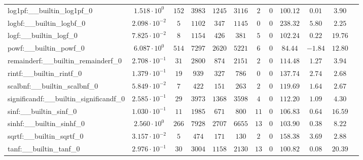 \begin{tabular}{|l|c|c|c|c|c|c|c|c|c|c|c|}
log1pf:\_\_builtin\_log1pf\_0             & $ 1.518 \cdot 10^{0}  $ & $ 152    $ & $ 3983   $ & $ 1245  $ & $ 3116  $ & $ 2   $ & $ 0 $ & $ 100.12      $ & $ 0.01    $ & $ 3.90    $ \\
logbf:\_\_builtin\_logbf\_0               & $ 2.098 \cdot 10^{-2} $ & $ 5      $ & $ 1102   $ & $ 347   $ & $ 1145  $ & $ 0   $ & $ 0 $ & $ 238.32      $ & $ 5.80    $ & $ 2.25    $ \\
logf:\_\_builtin\_logf\_0                 & $ 7.825 \cdot 10^{-2} $ & $ 8      $ & $ 1154   $ & $ 426   $ & $ 381   $ & $ 5   $ & $ 0 $ & $ 102.24      $ & $ 0.22    $ & $ 19.76   $ \\
powf:\_\_builtin\_powf\_0                 & $ 6.087 \cdot 10^{0}  $ & $ 514    $ & $ 7297   $ & $ 2620  $ & $ 5221  $ & $ 6   $ & $ 0 $ & $ 84.44       $ & $ -1.84   $ & $ 12.80   $ \\
remainderf:\_\_builtin\_remainderf\_0     & $ 2.708 \cdot 10^{-1} $ & $ 31     $ & $ 2800   $ & $ 874   $ & $ 2151  $ & $ 2   $ & $ 0 $ & $ 114.48      $ & $ 1.27    $ & $ 3.94    $ \\
rintf:\_\_builtin\_rintf\_0               & $ 1.379 \cdot 10^{-1} $ & $ 19     $ & $ 939    $ & $ 327   $ & $ 786   $ & $ 0   $ & $ 0 $ & $ 137.74      $ & $ 2.74    $ & $ 2.68    $ \\
scalbnf:\_\_builtin\_scalbnf\_0           & $ 5.849 \cdot 10^{-2} $ & $ 7      $ & $ 422    $ & $ 151   $ & $ 263   $ & $ 2   $ & $ 0 $ & $ 119.69      $ & $ 1.64    $ & $ 2.67    $ \\
significandf:\_\_builtin\_significandf\_0 & $ 2.585 \cdot 10^{-1} $ & $ 29     $ & $ 3973   $ & $ 1368  $ & $ 3598  $ & $ 4   $ & $ 0 $ & $ 112.20      $ & $ 1.09    $ & $ 4.30    $ \\
sinf:\_\_builtin\_sinf\_0                 & $ 1.030 \cdot 10^{-1} $ & $ 11     $ & $ 1985   $ & $ 671   $ & $ 800   $ & $ 11  $ & $ 0 $ & $ 106.83      $ & $ 0.64    $ & $ 16.59   $ \\
sinhf:\_\_builtin\_sinhf\_0               & $ 2.560 \cdot 10^{0}  $ & $ 266    $ & $ 7928   $ & $ 2707  $ & $ 6655  $ & $ 13  $ & $ 0 $ & $ 103.90      $ & $ 0.38    $ & $ 8.22    $ \\
sqrtf:\_\_builtin\_sqrtf\_0               & $ 3.157 \cdot 10^{-2} $ & $ 5      $ & $ 474    $ & $ 171   $ & $ 130   $ & $ 2   $ & $ 0 $ & $ 158.38      $ & $ 3.69    $ & $ 2.88    $ \\
tanf:\_\_builtin\_tanf\_0                 & $ 2.976 \cdot 10^{-1} $ & $ 30     $ & $ 3004   $ & $ 1158  $ & $ 2130  $ & $ 13  $ & $ 0 $ & $ 100.82      $ & $ 0.08    $ & $ 20.39   $ \\

\end{tabular}
